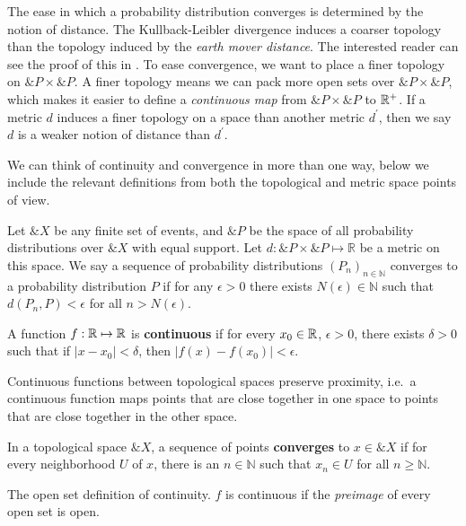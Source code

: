 The ease in which a probability distribution converges is determined
by the notion of distance.  The Kullback-Leibler divergence induces a
coarser topology than the topology induced by the \textit{earth mover
  distance}. The interested reader can see the proof of this in
\cite{ref:arjovsky-2017}.  To ease convergence, we want to place a
finer topology on $\&P \times \&P$.  A finer topology means we can
pack more open sets over $\&P \times \&P$, which makes it easier to
define a \textit{continuous map} from $\&P \times \&P$ to $\mathbb{R}^+$.  If
a metric $d$ induces a finer topology on a space than another metric
$d^\prime$, then we say $d$ is a weaker notion of distance than
$d^\prime$.

We can think of continuity and convergence in more than one way, below
we include the relevant definitions from both the topological and
metric space points of view.

\begin{definition}
  Let $\&X$ be any finite set of events, and $\&P$ be the space of all
  probability distributions over $\&X$ with equal support. Let
  $d: \&P \times \&P \mapsto \mathbb{R}$ be a metric on this space. We
  say a sequence of probability distributions
  $(P_n)_{n \in \mathbb{N}}$ converges to a probability distribution
  $P$ if for any $\epsilon > 0$ there exists
  $N(\epsilon) \in \mathbb{N}$ such that $d(P_n,P) < \epsilon$ for all
  $n > N(\epsilon)$.
\end{definition}

\begin{definition}
  A function $f: \mathbb{R} \mapsto \mathbb{R}$ is \textbf{continuous} if for every
  $x_0 \in \mathbb{R}$, $\epsilon > 0$, there exists $\delta > 0$ such that if
  $|x - x_0| < \delta$, then $|f(x) - f(x_0)| < \epsilon$.
\end{definition}

Continuous functions between topological spaces preserve proximity,
i.e.\ a continuous function maps points that are close together in one
space to points that are close together in the other space.

\begin{definition}
  In a topological space $\&X$, a sequence of points
  \textbf{converges} to $x \in \&X$ if for every neighborhood $U$ of
  $x$, there is an $n \in \mathbb{N}$ such that $x_n \in U$ for all
  $n \geq \mathbb{N}$.
\end{definition}

The open set definition of continuity.  $f$ is continuous if the
\textit{preimage} of every open set is open.


